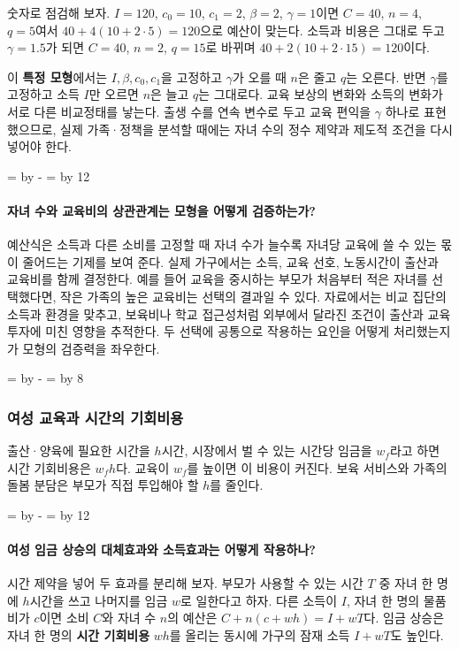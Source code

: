 \documentclass[10pt,a4paper]{article}
\newcommand{\ReserveQuestionSpace}{%
  \par\begingroup
  \dimen0=\pagegoal \advance\dimen0 by -\pagetotal
  \dimen2=\baselineskip \multiply\dimen2 by 12
  \ifdim\dimen0<\dimen2 \newpage\fi
  \endgroup}
\newcommand{\ReserveReadingSectionSpace}{%
  \par\begingroup
  \dimen0=\pagegoal \advance\dimen0 by -\pagetotal
  \dimen2=\baselineskip \multiply\dimen2 by 8
  \ifdim\dimen0<\dimen2 \newpage\fi
  \endgroup}
\begin{document}
숫자로 점검해 보자. $I=120$, $c_0=10$, $c_1=2$, $\beta=2$, $\gamma=1$이면 $C=40$, $n=4$, $q=5$여서 $40+4(10+2\cdot5)=120$으로 예산이 맞는다. 소득과 비용은 그대로 두고 $\gamma=1.5$가 되면 $C=40$, $n=2$, $q=15$로 바뀌며 $40+2(10+2\cdot15)=120$이다.\par

이 \textbf{특정 모형}에서는 $I,\beta,c_0,c_1$을 고정하고 $\gamma$가 오를 때 $n$은 줄고 $q$는 오른다. 반면 $\gamma$를 고정하고 소득 $I$만 오르면 $n$은 늘고 $q$는 그대로다. 교육 보상의 변화와 소득의 변화가 서로 다른 비교정태를 낳는다. 출생 수를 연속 변수로 두고 교육 편익을 $\gamma$ 하나로 표현했으므로, 실제 가족·정책을 분석할 때에는 자녀 수의 정수 제약과 제도적 조건을 다시 넣어야 한다.\par

\ReserveQuestionSpace
\paragraph{자녀 수와 교육비의 상관관계는 모형을 어떻게 검증하는가?}
예산식은 소득과 다른 소비를 고정할 때 자녀 수가 늘수록 자녀당 교육에 쓸 수 있는 몫이 줄어드는 기제를 보여 준다. 실제 가구에서는 소득, 교육 선호, 노동시간이 출산과 교육비를 함께 결정한다. 예를 들어 교육을 중시하는 부모가 처음부터 적은 자녀를 선택했다면, 작은 가족의 높은 교육비는 선택의 결과일 수 있다. 자료에서는 비교 집단의 소득과 환경을 맞추고, 보육비나 학교 접근성처럼 외부에서 달라진 조건이 출산과 교육투자에 미친 영향을 추적한다. 두 선택에 공통으로 작용하는 요인을 어떻게 처리했는지가 모형의 검증력을 좌우한다.\par

\ReserveReadingSectionSpace
\subsubsection*{여성 교육과 시간의 기회비용}

출산·양육에 필요한 시간을 $h$시간, 시장에서 벌 수 있는 시간당 임금을 $w_f$라고 하면 시간 기회비용은 $w_fh$다. 교육이 $w_f$를 높이면 이 비용이 커진다. 보육 서비스와 가족의 돌봄 분담은 부모가 직접 투입해야 할 $h$를 줄인다.\par

\ReserveQuestionSpace
\paragraph{여성 임금 상승의 대체효과와 소득효과는 어떻게 작용하나?}
시간 제약을 넣어 두 효과를 분리해 보자. 부모가 사용할 수 있는 시간 $T$ 중 자녀 한 명에 $h$시간을 쓰고 나머지를 임금 $w$로 일한다고 하자. 다른 소득이 $I$, 자녀 한 명의 물품비가 $c$이면 소비 $C$와 자녀 수 $n$의 예산은 $C+n(c+wh)=I+wT$다. 임금 상승은 자녀 한 명의 \textbf{시간 기회비용} $wh$를 올리는 동시에 가구의 잠재 소득 $I+wT$도 높인다.\par
\end{document}

